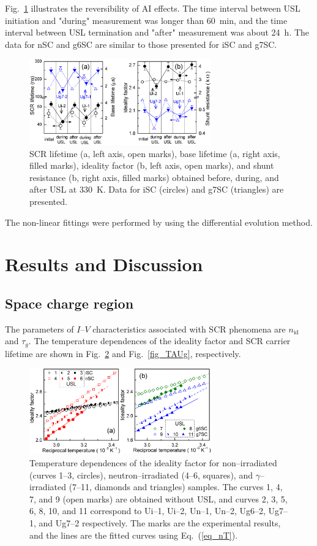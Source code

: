 \documentclass[aip,jap, amsmath,amssymb,reprint]{revtex4-1}
\begin{document}
Fig.~\ref{fig_Reverse} illustrates the reversibility of AI effects.
The time interval between USL initiation and "during" measurement was longer than 60~min,
and the time interval between USL termination and "after" measurement was about 24~h.
The data for nSC and g6SC are similar to those presented for iSC and g7SC.



\begin{figure}
\includegraphics[width=0.7\textwidth]{fig_2ab}%
\caption{\label{fig_Reverse}
SCR lifetime (a, left axis, open marks),
base lifetime (a, right axis, filled marks),
ideality factor (b, left axis, open marks), and
shunt resistance (b, right axis, filled marks)
obtained before, during, and after USL at 330~K.
Data for iSC (circles) and g7SC (triangles) are presented.
}%
\end{figure}


The non-linear fittings were performed by using the differential evolution method.\cite{DEWang}


\section{Results and Discussion}
\subsection{Space charge region\label{SCR}}
The parameters of $I$--$V$ characteristics associated with SCR phenomena are $n_{\mathrm{id}}$ and $\tau_{g}$.
The temperature dependences of the ideality factor and SCR carrier lifetime are shown in Fig.~\ref{fig_n} and Fig.~\ref{fig_TAUg}, respectively.

\begin{figure}
\includegraphics[width=0.7\textwidth]{fig_3ab}%
\caption{\label{fig_n}
Temperature dependences of the ideality factor for non--irradiated (curves 1--3, circles),
neutron--irradiated (4--6, squares), and $\gamma$--irradiated (7--11, diamonds and triangles) samples.
The curves 1, 4, 7, and 9 (open marks) are obtained without USL,
and curves 2, 3, 5, 6, 8, 10, and 11 correspond to
Ui--1, Ui--2, Un--1, Un--2, Ug6--2, Ug7--1, and Ug7--2 respectively.
The marks are the experimental results, and the lines are the fitted curves using Eq.~(\ref{eq_nT}).
}%
\end{figure}
\end{document}
